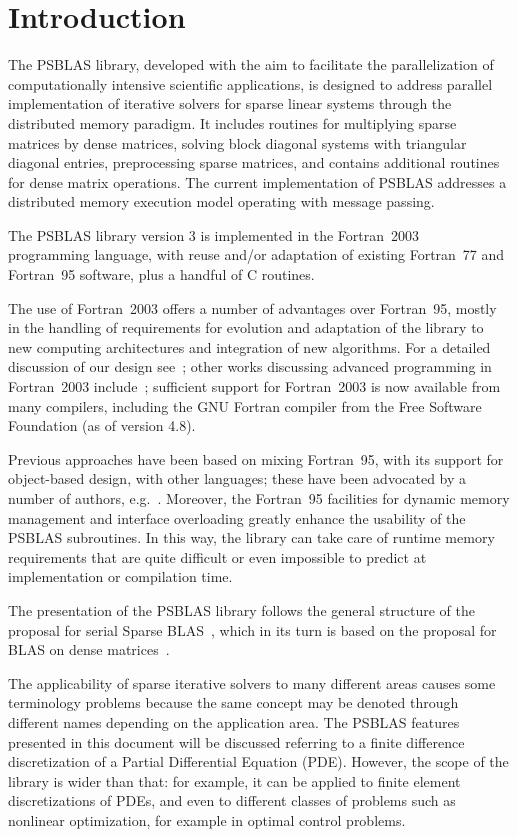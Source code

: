 \section{Introduction}\label{sec:intro}

The PSBLAS library, developed with the aim to facilitate the
parallelization of computationally intensive scientific applications,
is designed to address parallel implementation of iterative solvers
for sparse linear systems through the distributed memory paradigm.  It
includes routines for multiplying sparse matrices by dense matrices,
solving block diagonal systems with triangular diagonal entries,
preprocessing sparse matrices, and contains additional routines for
dense matrix operations.  The current implementation of PSBLAS
addresses a distributed memory execution model operating with message
passing. 

The PSBLAS library version 3 is  implemented in
 the Fortran~2003~\cite{metcalf} programming language, with reuse and/or
 adaptation of  existing Fortran~77 and Fortran~95 software, plus a
 handful of C  routines. 

The use of Fortran~2003 offers a number of advantages over Fortran~95,
mostly in the handling of requirements for evolution and adaptation of
the library to new computing architectures and integration of
new algorithms. 
For a detailed discussion of our design see~\cite{Sparse03}; other
works discussing advanced programming in Fortran~2003
include~\cite{DesPat:11,RouXiaXu:11}; sufficient support for
Fortran~2003 is now available from many compilers, including the GNU
Fortran compiler from the Free Software Foundation (as of version 4.8). 


Previous approaches have been based on mixing Fortran~95, with its
support for object-based design, with other languages; these have
been advocated by a number of authors, 
e.g.~\cite{machiels}.  Moreover, the Fortran~95 facilities for dynamic
memory management and interface overloading greatly enhance the
usability of the PSBLAS 
subroutines. In this way, the library can take care of runtime memory
requirements that are quite difficult or even impossible to predict at
implementation or compilation time.  

The presentation of the
PSBLAS library follows the general structure of the proposal for
serial Sparse BLAS~\cite{sblas97,sblas02}, which in its turn is based on the
proposal for BLAS on dense matrices~\cite{BLAS1,BLAS2,BLAS3}.

The applicability of sparse iterative solvers to many different areas
causes some terminology problems because the same concept may be
denoted through different names depending on the application area. The
PSBLAS features presented in this document will be discussed referring
to a   finite difference discretization of a Partial Differential
Equation (PDE). However, the scope of the library is wider than
that: for example, it can be applied to finite element discretizations
of PDEs, and even to different classes of problems such as nonlinear
optimization, for example in optimal control problems.

